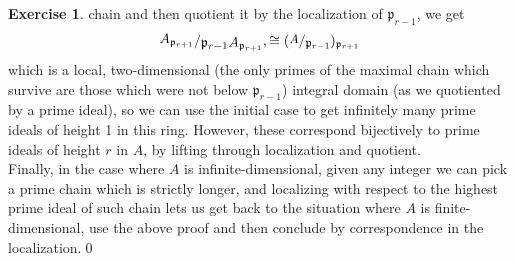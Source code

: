 \documentclass[a4paper]{article}
\newcommand{\ssfrac}[2]{
    \raisebox{+0.3ex}{$#1$}
    /
    \raisebox{-0.3ex}{$#2$}
}
\newcommand{\sfrac}[2]{
    \raisebox{+0.3ex}{\scalebox{0.9}{$#1$}}
    /
    \raisebox{-0.3ex}{\scalebox{0.9}{$#2$}}
}
\theoremstyle{definition}
\theoremstyle{definition}
\theoremstyle{remark}
\theoremstyle{definition}
\newtheorem{exercise}{Exercise}[section]
\begin{document}
\begin{exercise}
	chain and then quotient it by the localization of $\mathfrak{p}_{r-1}$, we get
	$$
	\ssfrac{A_{\mathfrak{p}_{r+1}}}{\mathfrak{p}_{r-1}A_{\mathfrak{p}_{r+1}}},\cong
	(\sfrac{A}{\mathfrak{p}_{r-1}})_{\mathfrak{p}_{r+1}}
	$$
	which
	is a local, two-dimensional (the only primes of the maximal chain which survive are those which were not below $\mathfrak{p}_{r-1}$) integral domain (as we quotiented by a
	prime ideal), so we can use the
	initial case to get infinitely many prime ideals of height 1 in this ring. However, these correspond bijectively to prime ideals of height $r$ in $A$, by lifting through
	localization and quotient.\\
	Finally, in the case where $A$ is infinite-dimensional, given any integer we can pick a prime chain which is strictly longer, and localizing with respect to the highest
	prime ideal of such chain lets us get back to the situation where $A$ is finite-dimensional, use the above proof and then conclude by correspondence in the
	localization.\qed
\end{exercise}
\end{document}
